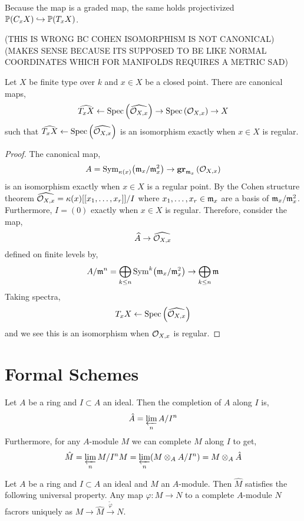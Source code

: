 \documentclass[12pt]{article}
\begin{document}
\begin{rmk}
Because the map is a graded map, the same holds projectivized $\mathbb{P}(C_x X) \hookrightarrow \mathbb{P}(T_x X)$.
\end{rmk}

(THIS IS WRONG BC COHEN ISOMORPHISM IS NOT CANONICAL)
(MAKES SENSE BECAUSE ITS SUPPOSED TO BE LIKE NORMAL COORDINATES WHICH FOR MANIFOLDS REQUIRES A METRIC SAD)

\begin{prop}
Let $X$ be finite type over $k$ and $x \in X$ be a closed point. There are canonical maps,
\[ \widehat{T_x X} \leftarrow \mathrm{Spec}\left( \widehat{\mathcal{O}_{X, x}} \right) \to \mathrm{Spec}\left( \mathcal{O}_{X, x} \right) \to X \]
such that $\widehat{T_x X} \leftarrow \mathrm{Spec}\left( \widehat{\mathcal{O}_{X, x}} \right)$ is an isomorphism exactly when $x \in X$ is regular.
\end{prop}

\begin{proof}
The canonical map,
\[ A = \mathrm{Sym}_{\kappa(x)}\! \left( \mathfrak{m}_x/\mathfrak{m}_x^2 \right) \to \mathbf{gr}_{\mathfrak{m}_x}\left(\mathcal{O}_{X, x}\right) \]
is an isomorphism exactly when $x \in X$ is a regular point. By the Cohen structure theorem $\widehat{\mathcal{O}_{X, x}} = \kappa(x)[[x_1, \dots, x_r]] / I$ where $x_1, \dots, x_r \in \mathfrak{m}_x$ are a basis of $\mathfrak{m}_x / \mathfrak{m}_x^2$. Furthermore, $I = (0)$ exactly when $x \in X$ is regular. Therefore, consider the map,
\[ \widehat{A} \to \widehat{\mathcal{O}_{X, x}} \]
defined on finite levels by,
\[ A / \mathfrak{m}^n = \bigoplus_{k \le n} \mathrm{Sym}^{k}\! \left( \mathfrak{m}_x / \mathfrak{m}_x^2 \right) \to \bigoplus_{k \le n} \mathfrak{m} \]
Taking spectra,
\[ T_x X \leftarrow \mathrm{Spec}\left( \widehat{\mathcal{O}_{X, x}} \right) \]
and we see this is an isomorphism when $\mathcal{O}_{X, x}$ is regular.
\end{proof}

\section{Formal Schemes}

\begin{defn}
Let $A$ be a ring and $I \subset A$ an ideal. Then the completion of $A$ along $I$ is,
\[ \hat{A} = \varprojlim_{n} A / I^n \]
Furthermore, for any $A$-module $M$ we can complete $M$ along $I$ to get,
\[ \hat{M} = \varprojlim_{n} M / I^n M = \varprojlim_{n}( M \otimes_A A / I^n) = M \otimes_A \hat{A} \]
\end{defn}

\begin{prop}
Let $A$ be a ring and $I \subset A$ an ideal and $M$ an $A$-module. Then $\hat{M}$ satisfies the following universal property. Any map $\varphi : M \to N$ to a complete $A$-module $N$ facrors uniquely as $M \to \hat{M} \xrightarrow{\tilde{\varphi}} N$. 
\end{prop}
\end{document}
